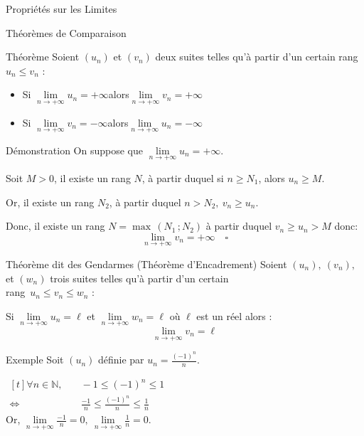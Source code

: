 \documentclass{cours}
\begin{document}
    \begin{Gpartie}{Propriétés sur les Limites} 
        \begin{Spartie}{Théorèmes de Comparaison} 
            \begin{SSpartie}{Théorème} 
                Soient $(u_n)$ et $(v_n)$ deux suites telles qu'à partir d'un certain rang $u_n\leq v_n$ :
                \begin{itemize}
                    \setlength\itemsep{0.5em}
                    \item Si $\lim\limits_{n\to +\infty}u_n=+\infty$\quad alors\quad $\lim\limits_{n\to +\infty}v_n=+\infty$
                    \item Si $\lim\limits_{n\to +\infty}v_n=-\infty$\quad alors\quad $\lim\limits_{n\to +\infty}u_n=-\infty$
                \end{itemize}
            \end{SSpartie}
            \begin{SSpartie}{Démonstration} 
                On suppose que $\lim\limits_{n\to +\infty}u_n=+\infty$.

                Soit $M>0$, il existe un rang $N$, à partir duquel si $n\geq N_1$, alors $u_n\geq M$.

                Or, il existe un rang $N_2$, à partir duquel $n>N_2,\ v_n\geq u_n$.

                Donc, il existe un rang $N=\max\,(N_1\,; N_2)$ à partir duquel $v_n\geq u_n>M$ donc: \[\lim\limits_{n\to +\infty}v_n=+\infty\quad\square\]
            \end{SSpartie}
            \begin{SSpartie}{Théorème dit \og des Gendarmes \fg{} (Théorème d'Encadrement)}
                Soient $(u_n),~(v_n),$ et $(w_n)$ trois suites telles qu'à partir d'un certain \\ rang~${u_n\leq v_n\leq w_n}$ :

                Si $\lim\limits_{n\to +\infty}u_n=\ell$ et $\lim\limits_{n\to +\infty}w_n=\ell$ où $\ell$ est un réel alors :
                \[\lim\limits_{n\to +\infty}v_n=\ell\]
            \end{SSpartie}
            \begin{SSpartie}{Exemple} 
                Soit $(u_n)$ définie par $u_n=\frac{(-1)^n}{n}$.

                $\begin{aligned}[t]
                    \forall n\in\mathbb{N},&\quad-1\leq (-1)^n\leq 1 \\
                    \iff&\quad\frac{-1}{n}\leq\frac{(-1)^n}{n}\leq\frac{1}{n}
                \end{aligned}$ \\[2ex]
                Or, $\lim\limits_{n\to +\infty}\frac{-1}{n}=0,\ \lim\limits_{n\to +\infty}\frac{1}{n}=0$.


\end{SSpartie}
\end{Spartie}
\end{Gpartie}
\end{document}
